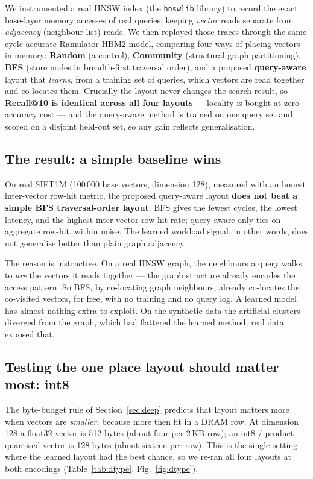 \documentclass[11pt,a4paper]{article}
\begin{document}
We instrumented a real HNSW index (the \texttt{hnswlib} library) to record the
exact base-layer memory accesses of real queries, keeping \emph{vector} reads
separate from \emph{adjacency} (neighbour-list) reads. We then replayed those
traces through the same cycle-accurate Ramulator HBM2 model, comparing four ways
of placing vectors in memory: \textbf{Random} (a control), \textbf{Community}
(structural graph partitioning), \textbf{BFS} (store nodes in breadth-first
traversal order), and a proposed \textbf{query-aware} layout that \emph{learns},
from a training set of queries, which vectors are read together and co-locates
them. Crucially the layout never changes the search result, so \textbf{Recall@10
is identical across all four layouts} --- locality is bought at zero accuracy cost
--- and the query-aware method is trained on one query set and scored on a
disjoint held-out set, so any gain reflects generalisation.

\subsection{The result: a simple baseline wins}

On real SIFT1M (100\,000 base vectors, dimension 128), measured with an honest
inter-vector row-hit metric, the proposed query-aware layout \textbf{does not
beat a simple BFS traversal-order layout}. BFS gives the fewest cycles, the
lowest latency, and the highest inter-vector row-hit rate; query-aware only ties
on aggregate row-hit, within noise. The learned workload signal, in other words,
does not generalise better than plain graph adjacency.

The reason is instructive. On a real HNSW graph, the neighbours a query walks to
\emph{are} the vectors it reads together --- the graph structure already encodes
the access pattern. So BFS, by co-locating graph neighbours, already co-locates
the co-visited vectors, for free, with no training and no query log. A learned
model has almost nothing extra to exploit. On the synthetic data the artificial
clusters diverged from the graph, which had flattered the learned method; real
data exposed that.

\subsection{Testing the one place layout should matter most: int8}

The byte-budget rule of Section~\ref{sec:deep} predicts that layout matters more
when vectors are \emph{smaller}, because more then fit in a DRAM row. At
dimension 128 a float32 vector is 512 bytes (about four per 2\,KB row); an int8 /
product-quantised vector is 128 bytes (about sixteen per row). This is the single
setting where the learned layout had the best chance, so we re-ran all four
layouts at both encodings (Table~\ref{tab:dtype}, Fig.~\ref{fig:dtype}).
\end{document}
